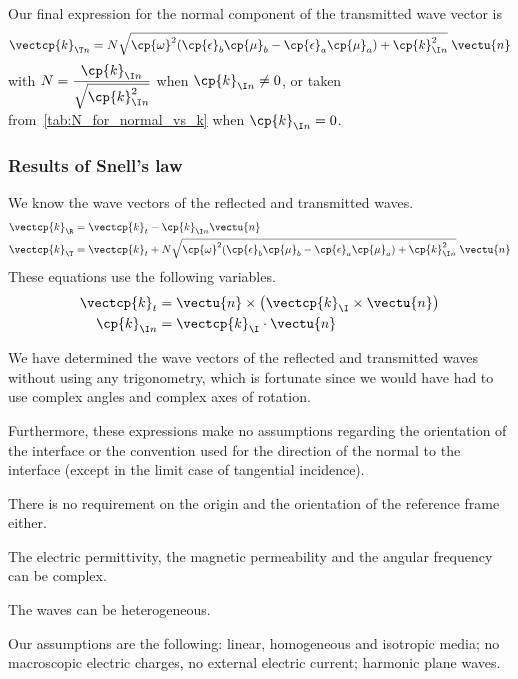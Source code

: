 \begin{refsection}
Our final expression for the normal component of the transmitted wave vector is
\begin{equation}
    \vectcp{k}_{\T n} =
    N
    \sqrt{\cp{\omega}^2 (\cp{\epsilon}_b \cp{\mu}_b - \cp{\epsilon}_a \cp{\mu}_a) + \cp{k}_{\I n}^2}
    \;
    \vectu{n}
\end{equation}
with $N=\dfrac{\cp{k}_{\I n}}{\sqrt{\cp{k}_{\I n}^2}}$ when $\cp{k}_{\I n} \neq 0$, or taken from~\cref{tab:N_for_normal_vs_k} when $\cp{k}_{\I n} = 0$.


\subsubsection{Results of Snell's law}
\label{sec:result_snells_law}
We know the wave vectors of the reflected and transmitted waves.
\begin{align}
    \vectcp{k}_\R
    &=
    \vectcp{k}_t
    -\cp{k}_{\I n}
    \vectu{n}
    \label{eq:snell_reflection}
    \\
    \vectcp{k}_\T
    &=
    \vectcp{k}_t
    +
    N
    \sqrt{\cp{\omega}^2 (\cp{\epsilon}_b \cp{\mu}_b - \cp{\epsilon}_a \cp{\mu}_a) + \cp{k}_{\I n}^2}
    \;
    \vectu{n}
    \label{eq:snell_transmission}
\end{align}
These equations use the following variables.
\begin{align}
    \vectcp{k}_t &= \vectu{n} \times \left(\vectcp{k}_\I \times \vectu{n} \right)
    \\
    \cp{k}_{\I n} &= \vectcp{k}_\I \cdot \vectu{n}
\end{align}

We have determined the wave vectors of the reflected and transmitted waves without using any trigonometry, which is fortunate since we would have had to use complex angles and complex axes of rotation.

Furthermore, these expressions make no assumptions regarding the orientation of the interface or the convention used for the direction of the normal to the interface (except in the limit case of tangential incidence).

There is no requirement on the origin and the orientation of the reference frame either.

The electric permittivity, the magnetic permeability and the angular frequency can be complex.

The waves can be heterogeneous.

Our assumptions are the following:
linear, homogeneous and isotropic media;
no macroscopic electric charges, no external electric current;
harmonic plane waves.


\end{refsection}
